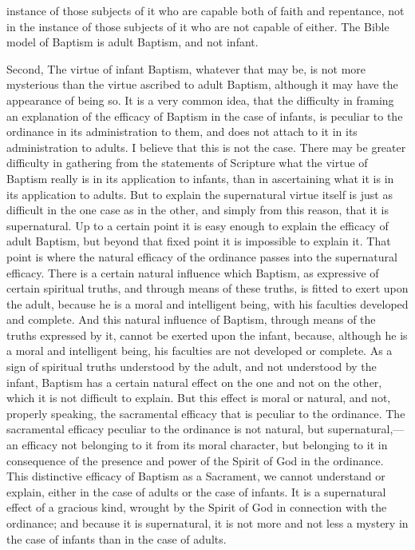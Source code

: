 \documentclass[]{book}
\begin{document}
instance of those subjects of it who are capable both of faith and repentance, not in the instance of those subjects of it who are not capable of either. The Bible model of Baptism is adult Baptism, and not infant.

Second, The virtue of infant Baptism, whatever that may be, is not more mysterious than the virtue ascribed to adult Baptism, although it may have the appearance of being so. It is a very common idea, that the difficulty in framing an explanation of the efficacy of Baptism in the case of infants, is peculiar to the ordinance in its administration to them, and does not attach to it in its administration to adults. I believe that this is not the case. There may be greater difficulty in gathering from the statements of Scripture what the virtue of Baptism really is in its application to infants, than in ascertaining what it is in its application to adults. But to explain the supernatural virtue itself is just as difficult in the one case as in the other, and simply from this reason, that it is supernatural. Up to a certain point it is easy enough to explain the efficacy of adult Baptism, but beyond that fixed point it is impossible to explain it. That point is where the natural efficacy of the ordinance passes into the supernatural efficacy. There is a certain natural influence which Baptism, as expressive of certain spiritual truths, and through means of these truths, is fitted to exert upon the adult, because he is a moral and intelligent being, with his faculties developed and complete. And this natural influence of Baptism, through means of the truths expressed by it, cannot be exerted upon the infant, because, although he is a moral and intelligent being, his faculties are not developed or complete. As a sign of spiritual truths understood by the adult, and not understood by the infant, Baptism has a certain natural effect on the one and not on the other, which it is not difficult to explain. But this effect is moral or natural, and not, properly speaking, the sacramental efficacy that is peculiar to the ordinance. The sacramental efficacy peculiar to the ordinance is not natural, but supernatural,---an efficacy not belonging to it from its moral character, but belonging to it in consequence of the presence and power of the Spirit of God in the ordinance. This distinctive efficacy of Baptism as a Sacrament, we cannot understand or explain, either in the case of adults or the case of infants. It is a supernatural effect of a gracious kind, wrought by the Spirit of God in connection with the ordinance; and because it is supernatural, it is not more and not less a mystery in the case of infants than in the case of adults.
\end{document}
